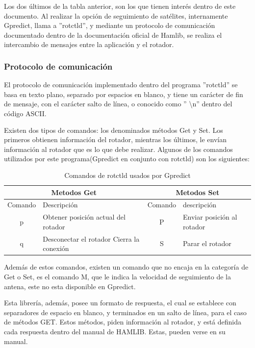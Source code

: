 Los dos últimos de la tabla anterior, son los que tienen interés dentro de este documento. Al realizar la opción de seguimiento de satélites, internamente Gpredict, llama a ''rotctld'', y mediante un protocolo de comunicación documentado dentro de la documentación oficial de Hamlib, se realiza el intercambio de mensajes entre la aplicación y el rotador. 

\subsubsection{Protocolo de comunicación} \label{subsub:protocol_com}
El protocolo de comunicación implementado dentro del programa ''rotctld'' se basa en texto plano, separado por espacios en blanco, y tiene un carácter de fin de mensaje, con el carácter salto de línea, o conocido como '' \textbackslash{}n'' dentro del código ASCII. 

Existen dos tipos de comandos: los denominados métodos Get y Set. Los primeros obtienen información del rotador, mientras los últimos, le envían información al rotador que es lo que debe realizar. Algunos de los comandos utilizados por este programa(Gpredict en conjunto con rotctld) son los siguientes: 

\begin{table}[H]
	\centering
	\begin{tabular}{|c|p{5cm}|c|p{5cm}|}
		\hline
		\multicolumn{2}{|c|}{Metodos Get}  &  \multicolumn{2}{|c|}{Metodos Set}  \\ 
		\hline
		Comando & Descripción & Comando & descripción	\\
		\hline
		p & Obtener posición actual del rotador  &P& Enviar posición al rotador \\
		\hline 
		q & Desconectar el rotador 	Cierra la conexión & S & Parar el rotador \\ 
		\hline 	
	\end{tabular}
	\caption{Comandos de rotctld usados por Gpredict} 
	\label{tab:commands_Gpredict}
\end{table}

Además de estos comandos, existen un comando que no encaja en la categoría de Get o Set, es el comando M, que le indica la velocidad de seguimiento de la antena, este no esta disponible en Gpredict. 

Esta librería, además, posee un formato de respuesta, el cual se establece con separadores de espacio en blanco, y terminados en un salto de línea, para el caso de métodos GET. Estos métodos, piden información al rotador, y está definida cada respuesta dentro del manual de HAMLIB. Estas, pueden verse en su manual. 

